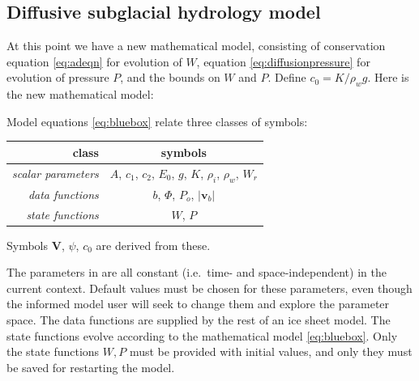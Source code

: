 \documentclass[11pt,final]{amsart}%
\newcommand*\mybluebox[1]{%
\colorbox{myblue}{\hspace{1em}#1\hspace{1em}}}
\newcommand\bv{\mathbf{v}}
\newcommand\bV{\mathbf{V}}
\newcommand{\Div}{\nabla\cdot}
\newcommand{\grad}{\nabla}
\begin{document}
\subsection*{Diffusive subglacial hydrology model}  At this point we have a new mathematical model, consisting of conservation equation \eqref{eq:adeqn} for evolution of $W$, equation \eqref{eq:diffusionpressure} for evolution of pressure $P$, and the bounds on $W$ and $P$.  Define $c_0 = K / \rho_w g$.  Here is the new mathematical model:

Model equations \eqref{eq:bluebox} relate three classes of symbols:

\begin{table}[h]
\begin{tabular}{r|c}
class & symbols \\ \hline
\emph{scalar parameters} & $A$, $c_1$, $c_2$, $E_0$, $g$, $K$, $\rho_i$, $\rho_w$, $W_r$ \\
\emph{data functions} & $b$, $\Phi$, $P_o$, $|\bv_b|$ \\
\emph{state functions} & $W$, $P$
\end{tabular}
\end{table}

\noindent Symbols $\bV$, $\psi$, $c_0$ are derived from these.

The parameters in are all constant (i.e.~time- and space-independent) in the current context.  %
Default values must be chosen for these parameters, even though the informed model user will seek to change them and explore the parameter space.  The data functions are supplied by the rest of an ice sheet model.  The state functions evolve according to the mathematical model \eqref{eq:bluebox}.  Only the state functions $W,P$ must be provided with initial values, and only they must be saved for restarting the model.
\end{document}

